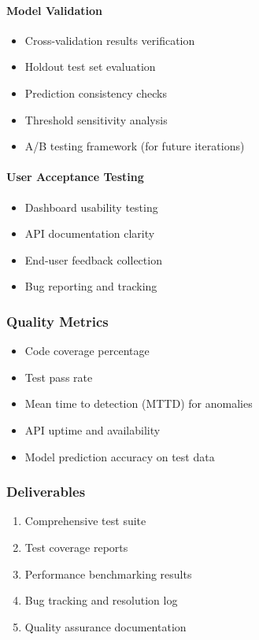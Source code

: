 \documentclass[12pt,a4paper]{article}
\begin{document}
\paragraph{Model Validation}
\begin{itemize}[leftmargin=*]
    \item Cross-validation results verification
    \item Holdout test set evaluation
    \item Prediction consistency checks
    \item Threshold sensitivity analysis
    \item A/B testing framework (for future iterations)
\end{itemize}

\paragraph{User Acceptance Testing}
\begin{itemize}[leftmargin=*]
    \item Dashboard usability testing
    \item API documentation clarity
    \item End-user feedback collection
    \item Bug reporting and tracking
\end{itemize}

\subsubsection{Quality Metrics}
\begin{itemize}[leftmargin=*]
    \item Code coverage percentage
    \item Test pass rate
    \item Mean time to detection (MTTD) for anomalies
    \item API uptime and availability
    \item Model prediction accuracy on test data
\end{itemize}

\subsubsection{Deliverables}
\begin{enumerate}
    \item Comprehensive test suite
    \item Test coverage reports
    \item Performance benchmarking results
    \item Bug tracking and resolution log
    \item Quality assurance documentation
\end{enumerate}
\end{document}
